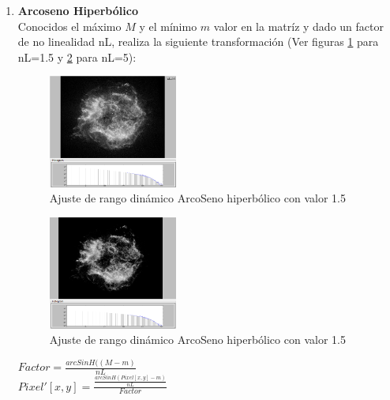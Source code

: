 \begin{enumerate}
		\clearpage
		\item \textbf{Arcoseno Hiperbólico}\\
		Conocidos el máximo $M$ y el mínimo $m$ valor en la matríz y dado
		un factor de no linealidad nL, realiza la siguiente transformación  (Ver figuras \ref{fig:HDRasinh1_5} para nL=1.5 y \ref{fig:HDRasinh5} para nL=5):\\
			\begin{figure}[!htb]
				\centering
				\includegraphics[width=0.4\textwidth]{images/HDREQ/chandraaSinH_0_5.jpg}
				\caption{\label{fig:HDRasinh1_5}{\small Ajuste de rango dinámico ArcoSeno hiperbólico con valor 1.5}}
			\end{figure}
			\begin{figure}[!htb]
				\centering
				\includegraphics[width=0.4\textwidth]{images/HDREQ/chandraaSinH_5.PNG}
				\caption{\label{fig:HDRasinh5}{\small Ajuste de rango dinámico ArcoSeno hiperbólico con valor 1.5}}
			\end{figure}
			\begin{center}
				{\large $Factor=\frac{arcSinH((M-m)}{nL}$}
				\\
				{\large $Pixel'[x,y]=\frac{\frac{arcSinH(Pixel[x,y]-m)}{nL}}{Factor}$}
			\end{center}
		\vfill



\end{enumerate}
